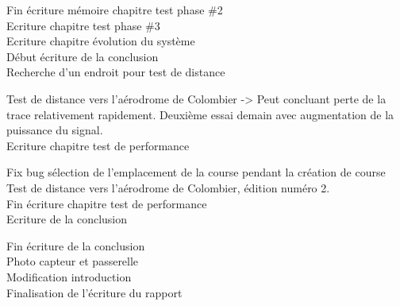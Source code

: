 \begin{multicols}{2}
Fin écriture mémoire chapitre test phase \#2\\
Ecriture chapitre test phase \#3\\
Ecriture chapitre évolution du système\\
Début écriture de la conclusion\\
Recherche d’un endroit pour test de distance

Test de distance vers l’aérodrome de Colombier -> Peut concluant perte de la trace relativement rapidement. Deuxième essai demain avec augmentation de la\\ puissance du signal.\\
Ecriture chapitre test de performance

Fix bug sélection de l’emplacement de la course pendant la création de course\\
Test de distance vers l’aérodrome de Colombier, édition numéro 2.\\
Fin écriture chapitre test de performance\\
Ecriture de la conclusion

Fin écriture de la conclusion\\
Photo capteur et passerelle\\
Modification introduction\\
Finalisation de l'écriture du rapport

\end{multicols}